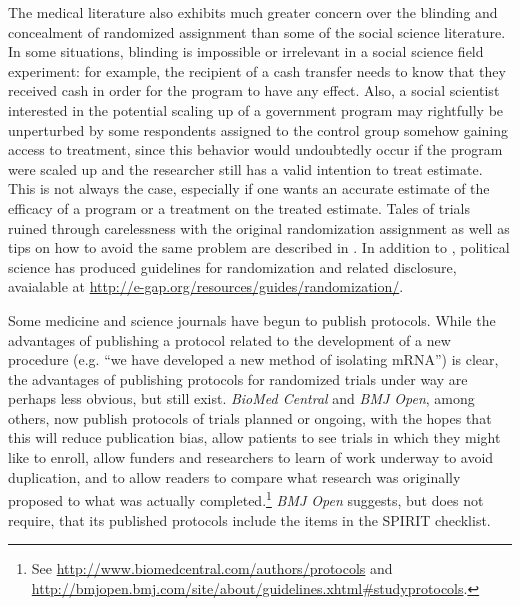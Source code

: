 \documentclass[12pt] {article}
\begin{document}
The medical literature also exhibits much greater concern over the blinding and concealment of randomized assignment than some of the social science literature. In some situations, blinding is impossible or irrelevant in a social science field experiment: for example, the recipient of a cash transfer needs to know that they received cash in order for the program to have any effect. Also, a social scientist interested in the potential scaling up of a government program may rightfully be unperturbed by some respondents assigned to the control group somehow gaining access to treatment, since this behavior would undoubtedly occur if the program were scaled up and the researcher still has a valid intention to treat estimate.  This is not always the case, especially if one wants an accurate estimate of the efficacy of a program or a treatment on the treated estimate. Tales of trials ruined through carelessness with the original randomization assignment as well as tips on how to avoid the same problem are described in \cite{schulz_allocation_2002}. In addition to \cite{bruhn_pursuit_2009}, political science has produced guidelines for randomization and related disclosure, avaialable at \url{http://e-gap.org/resources/guides/randomization/}.


 Some medicine and science journals have begun to publish protocols.   While the
advantages of publishing a protocol related to the development of a new
procedure (e.g. ``we have developed a new method of isolating mRNA'')
is clear, the advantages of publishing protocols for randomized
trials under way are perhaps less obvious, but still exist. \emph{BioMed
Central} and \emph{BMJ Open}, among others, now publish protocols of
trials planned or ongoing, with the hopes that this will reduce
publication bias, allow patients to see trials in which they might like
to enroll, allow funders and researchers to learn of work underway to
avoid duplication, and to allow readers to compare what research was
originally proposed to what was actually completed.\footnote{See
\url{http://www.biomedcentral.com/authors/protocols} and
\url{http://bmjopen.bmj.com/site/about/guidelines.xhtml\#studyprotocols}.}
\emph{BMJ Open} suggests, but does not require, that its published
protocols include the items in the SPIRIT checklist.
\end{document}
